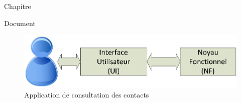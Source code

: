 \documentclass[9pt]{article}
\author{kalawa}
\title{}
\begin{document}
{\raggedright
Chapitre
}

{\raggedright
Document
}

\begin{figure}[h]
\begin{center}
\includegraphics[width=406pt]{img-1.eps}
\caption{Application de consultation des contacts}
\end{center}
\end{figure}
\end{document}
